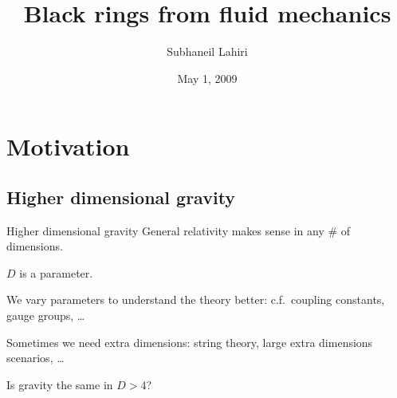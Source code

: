 \documentclass{beamer}
\title{Black rings from fluid mechanics}
\author{Subhaneil Lahiri}
\institute[Harvard]{%
based on \texttt{arXiv:0705.3404 [hep-th]} with Shiraz Minwalla \\
 and \texttt{arXiv:0903.4734 [hep-th]} with Jyotirmoy Bhattacharya
}
\date{May 1, 2009}
\newcommand{\rref}[1]{\hfill \small{\color{darkgrey} [#1]}}
\begin{document}

\begin{frame}
%
 \titlepage
%
\end{frame}


%
%
%
%
%
%

%
%

\section{Motivation}
\subsection{Higher dimensional gravity}

\begin{frame}{Higher dimensional gravity}
%
 General relativity makes sense in any \# of dimensions.

 \vp $D$ is a parameter. 

 \vp We vary parameters to understand the theory better: c.f.\ coupling constants, gauge groups, \ldots {}

 \vp Sometimes we need extra dimensions: string theory, large extra dimensions scenarios, \ldots

 \vp Is gravity the same in $D>4$?
%
\end{frame}
\end{document}
